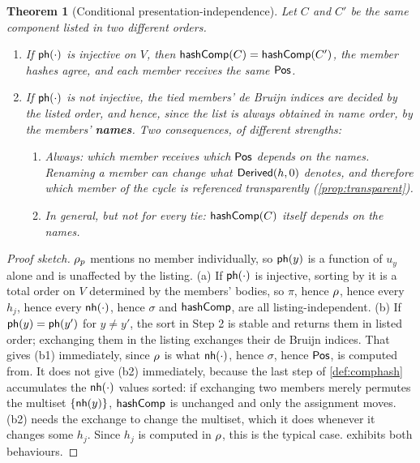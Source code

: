 \documentclass[11pt]{article}
\theoremstyle{definition}
\theoremstyle{plain}
\newtheorem{theorem}{Theorem}[section]
\theoremstyle{remark}
\begin{document}
\begin{theorem}[Conditional presentation-independence]\label{thm:ordering}
Let $C$ and $C'$ be the same component listed in two different orders.
\begin{enumerate}[nosep,label=(\alph*)]
  \item If $\mathsf{ph}(\cdot)$ is \emph{injective} on $V$, then $\mathsf{hashComp}(C) = \mathsf{hashComp}(C')$, the member
        hashes agree, and each member receives the same $\mathsf{Pos}$.
  \item If $\mathsf{ph}(\cdot)$ is not injective, the tied members' de Bruijn indices are decided by the
        listed order, and hence, since the list is always obtained in name order, by the
        members' \textbf{names}. Two consequences, of different strengths:
        \begin{enumerate}[nosep,label=(b\arabic*)]
          \item \emph{Always}: which member receives which $\mathsf{Pos}$ depends on the names. Renaming a
                member can change what $\mathsf{Derived}(h,0)$ denotes, and therefore which member of the cycle
                is referenced transparently (\cref{prop:transparent}).
          \item \emph{In general, but not for every tie}: $\mathsf{hashComp}(C)$ itself depends on the names.
        \end{enumerate}
\end{enumerate}
\end{theorem}
\begin{proof}[Proof sketch]
$\rho_p$ mentions no member individually, so $\mathsf{ph}(y)$ is a function of $u_y$ alone and is
unaffected by the listing. (a) If $\mathsf{ph}(\cdot)$ is injective, sorting by it is a total order on $V$
determined by the members' bodies, so $\pi$, hence $\rho$, hence every $h_j$, hence every
$\mathsf{nh}(\cdot)$, hence $\sigma$ and $\mathsf{hashComp}$, are all listing-independent. (b) If
$\mathsf{ph}(y) = \mathsf{ph}(y')$ for $y \neq y'$, the sort in Step 2 is stable and returns them in listed
order; exchanging them in the listing exchanges their de Bruijn indices. That gives (b1) immediately,
since $\rho$ is what $\mathsf{nh}(\cdot)$, hence $\sigma$, hence $\mathsf{Pos}$, is computed from. It does not
give (b2) immediately, because the last step of \cref{def:comphash} accumulates the $\mathsf{nh}(\cdot)$
values sorted: if exchanging two members merely permutes the multiset $\{\mathsf{nh}(y)\}$, $\mathsf{hashComp}$ is
unchanged and only the assignment moves. (b2) needs the exchange to change the multiset, which it
does whenever it changes some $h_j$. Since $h_j$ is computed in $\rho$, this is the typical case.
 exhibits both behaviours.
\end{proof}
\end{document}
